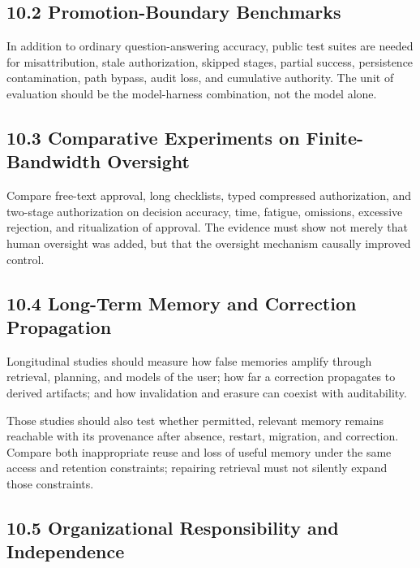 \subsection{10.2 Promotion-Boundary Benchmarks}\label{promotion-boundary-benchmarks}

In addition to ordinary question-answering accuracy, public test suites are needed for misattribution, stale authorization, skipped stages, partial success, persistence contamination, path bypass, audit loss, and cumulative authority. The unit of evaluation should be the model-harness combination, not the model alone.

\subsection{10.3 Comparative Experiments on Finite-Bandwidth Oversight}\label{comparative-experiments-on-finite-bandwidth-oversight}

Compare free-text approval, long checklists, typed compressed authorization, and two-stage authorization on decision accuracy, time, fatigue, omissions, excessive rejection, and ritualization of approval. The evidence must show not merely that human oversight was added, but that the oversight mechanism causally improved control.

\subsection{10.4 Long-Term Memory and Correction Propagation}\label{long-term-memory-and-correction-propagation}

Longitudinal studies should measure how false memories amplify through retrieval, planning, and models of the user; how far a correction propagates to derived artifacts; and how invalidation and erasure can coexist with auditability.

Those studies should also test whether permitted, relevant memory remains reachable with its provenance after absence, restart, migration, and correction. Compare both inappropriate reuse and loss of useful memory under the same access and retention constraints; repairing retrieval must not silently expand those constraints.

\subsection{10.5 Organizational Responsibility and Independence}\label{organizational-responsibility-and-independence}

